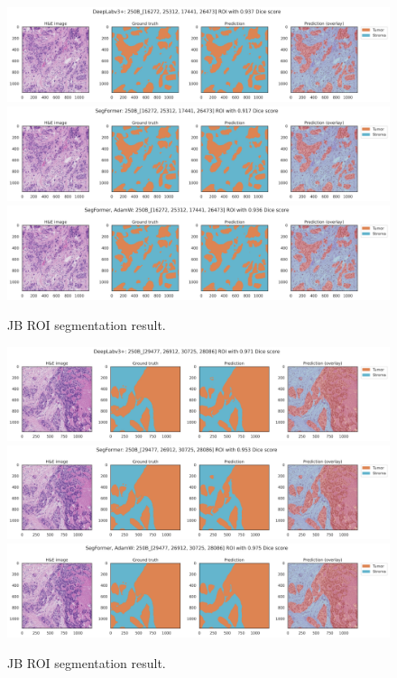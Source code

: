 \begin{figure}[H]
\includegraphics[width=\linewidth]{figures/tissue/deeplabv3+_dice_s_250B_[16272,_25312,_17441,_26473]_check.png}
\includegraphics[width=\linewidth]{figures/tissue/segformer_dice_s_250B_[16272,_25312,_17441,_26473]_check.png}
\includegraphics[width=\linewidth]{figures/tissue/segformer,_adamw_dice_s_250B_[16272,_25312,_17441,_26473]_check.png}

\caption{JB ROI segmentation result.}
\label{fig:s_250B_1}
\end{figure}

\begin{figure}[H]
\includegraphics[width=\linewidth]{figures/tissue/deeplabv3+_dice_s_250B_[29477,_26912,_30725,_28086]_check.png}
\includegraphics[width=\linewidth]{figures/tissue/segformer_dice_s_250B_[29477,_26912,_30725,_28086]_check.png}
\includegraphics[width=\linewidth]{figures/tissue/segformer,_adamw_dice_s_250B_[29477,_26912,_30725,_28086]_check.png}

\caption{JB ROI segmentation result.}
\label{fig:s_250B_2}
\end{figure}

